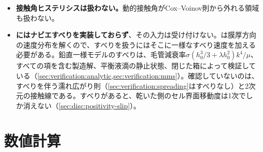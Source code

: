\begin{itemize}
  \item \textbf{接触角ヒステリシスは扱わない。}動的接触角がCox--Voinov則から外れる領域も扱わない。
  \item \textbf{にはナビエすべりを実装しておらず}、その入力は受け付けない。は膜厚方向の速度分布を解くので、すべりを扱うにはそこに一様なすべり速度を加える必要がある。鉛直一様モデルのすべりは、毛管減衰率$\sigma(h_0^{3}/3 + \lambda h_0^{2})k^{4}/\mu$、すべての項を含む製造解、平衡液滴の静止状態、閉じた箱によって検証している（\cref{sec:verification:analytic,sec:verification:mms}）。確認していないのは、すべりを伴う濡れ広がり則（\cref{sec:verification:spreading}はすべりなし）と2次元の接触線である。すべりがあると、乾いた側のセル界面移動度は1次でしか消えない（\cref{sec:disc:positivity-slip}）。
\end{itemize}

\section{数値計算}
\label{sec:notverified:numerics}

